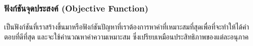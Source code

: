 \subsubsection{ฟังก์ชันจุดประสงค์ (Objective Function)}
เป็นฟังก์ชันที่เราสร้างขึ้นมาหรือฟังก์ชันปัญหาที่เราต้องการหาค่าที่เหมาะสมที่สุดเพื่อที่จะทำให้ได้คำตอบที่ดีที่สุด และจะใช้คำนวณหาค่าความเหมาะสม ซึ่งเปรียบเหมือนประสิทธิภาพของแต่ละอนุภาค \cite{Sansanee}



